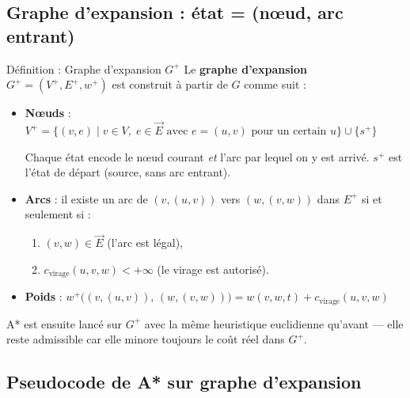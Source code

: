 \documentclass[12pt,a4paper]{article}
\theoremstyle{definition}
\theoremstyle{remark}
\begin{document}
\subsection{Graphe d'expansion : état = (nœud, arc entrant)}

\begin{defbox}{Définition : Graphe d'expansion $G^+$}
Le \textbf{graphe d'expansion} $G^+ = (V^+, E^+, w^+)$ est construit
à partir de $G$ comme suit :

\begin{itemize}[leftmargin=1.5em, itemsep=4pt]
  \item \textbf{Nœuds} : $V^+ = \{(v, e) \mid v \in V,\; e \in \vec{E}
    \text{ avec } e = (u, v) \text{ pour un certain } u\}
    \cup \{s^+\}$
    
    Chaque état encode le nœud courant \emph{et} l'arc par lequel
    on y est arrivé. $s^+$ est l'état de départ (source, sans arc entrant).

  \item \textbf{Arcs} : il existe un arc de $(v, (u,v))$ vers
    $(w, (v,w))$ dans $E^+$ si et seulement si :
    \begin{enumerate}
      \item $(v, w) \in \vec{E}$ (l'arc est légal),
      \item $c_\text{virage}(u, v, w) < +\infty$ (le virage est autorisé).
    \end{enumerate}

  \item \textbf{Poids} :
    $w^+\bigl((v,(u,v)),\,(w,(v,w))\bigr) = w(v,w,t) + c_\text{virage}(u,v,w)$
\end{itemize}
\end{defbox}

A* est ensuite lancé sur $G^+$ avec la même heuristique euclidienne
qu'avant — elle reste admissible car elle minore toujours le coût réel
dans $G^+$.

\subsection{Pseudocode de A* sur graphe d'expansion}
\end{document}

